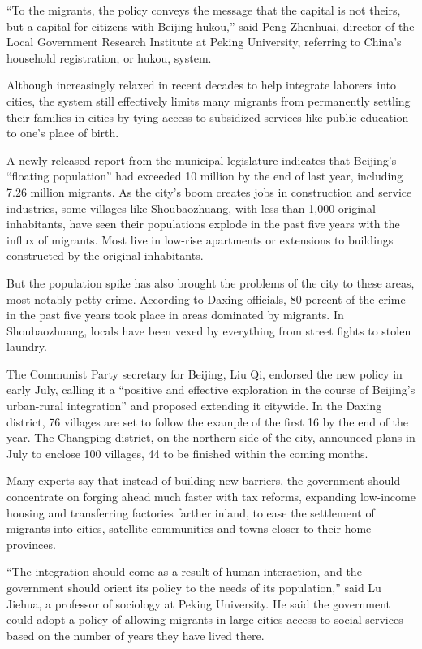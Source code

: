 ﻿\documentclass[12pt]{article}
\begin{document}
``To the migrants, the policy conveys the message that the capital is not theirs, but a capital for
citizens with Beijing hukou,'' said Peng Zhenhuai, director of the Local Government Research
Institute at Peking University, referring to China's household registration, or hukou, system.

Although increasingly relaxed in recent decades to help integrate laborers into cities, the system
still effectively limits many migrants from permanently settling their families in cities by tying
access to subsidized services like public education to one's place of birth.

A newly released report from the municipal legislature indicates that Beijing's ``floating
population'' had exceeded 10 million by the end of last year, including 7.26 million migrants. As
the city's boom creates jobs in construction and service industries, some villages like
Shoubaozhuang, with less than 1,000 original inhabitants, have seen their populations explode in the
past five years with the influx of migrants. Most live in low-rise apartments or extensions to
buildings constructed by the original inhabitants.

But the population spike has also brought the problems of the city to these areas, most notably
petty crime. According to Daxing officials, 80 percent of the crime in the past five years took
place in areas dominated by migrants. In Shoubaozhuang, locals have been vexed by everything from
street fights to stolen laundry.

The Communist Party secretary for Beijing, Liu Qi, endorsed the new policy in early July, calling it
a ``positive and effective exploration in the course of Beijing's urban-rural integration'' and
proposed extending it citywide. In the Daxing district, 76 villages are set to follow the example of
the first 16 by the end of the year. The Changping district, on the northern side of the city,
announced plans in July to enclose 100 villages, 44 to be finished within the coming months.

Many experts say that instead of building new barriers, the government should concentrate on forging
ahead much faster with tax reforms, expanding low-income housing and transferring factories farther
inland, to ease the settlement of migrants into cities, satellite communities and towns closer to
their home provinces.

``The integration should come as a result of human interaction, and the government should orient its
policy to the needs of its population,'' said Lu Jiehua, a professor of sociology at Peking
University. He said the government could adopt a policy of allowing migrants in large cities access
to social services based on the number of years they have lived there.
\end{document}
